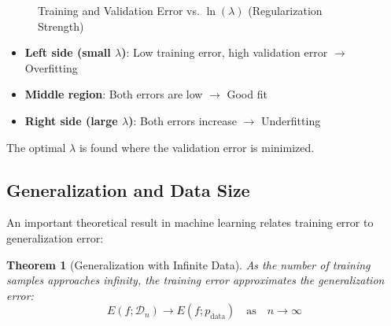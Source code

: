 \documentclass[11pt,a4paper]{article}
\theoremstyle{definition}
\theoremstyle{plain}
\newtheorem{theorem}{Theorem}[section]
\theoremstyle{remark}
\begin{document}
\begin{figure}[h]
\centering
{}
\caption{Training and Validation Error vs. $\ln(\lambda)$ (Regularization Strength)}
\end{figure}

\begin{itemize}
    \item \textbf{Left side (small $\lambda$)}: Low training error, high validation error $\rightarrow$ Overfitting
    \item \textbf{Middle region}: Both errors are low $\rightarrow$ Good fit
    \item \textbf{Right side (large $\lambda$)}: Both errors increase $\rightarrow$ Underfitting
\end{itemize}

The optimal $\lambda$ is found where the validation error is minimized.

\subsection{Generalization and Data Size}

An important theoretical result in machine learning relates training error to generalization error:

\begin{theorem}[Generalization with Infinite Data]
As the number of training samples approaches infinity, the training error approximates the generalization error:
\[
E(f; \mathcal{D}_n) \to E(f; p_{\text{data}}) \quad \text{as} \quad n \to \infty
\]
\end{theorem}
\end{document}
